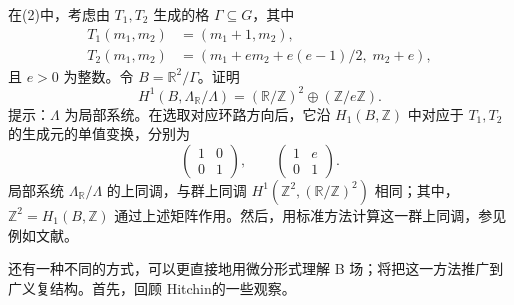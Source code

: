 \begin{exercise}\label{exer:6.23}
在(2)中，考虑由 $T_1,T_2$ 生成的格 $\Gamma\subseteq G$，其中
\[
\begin{aligned}
T_1(m_1,m_2)&=(m_1+1,m_2),\\
T_2(m_1,m_2)&=(m_1+em_2+e(e-1)/2,\;m_2+e),
\end{aligned}
\]
且 $e>0$ 为整数。令 $B=\mathbb R^2/\Gamma$。证明
\[
H^1(B,\Lambda_{\mathbb R}/\Lambda)
=(\mathbb R/\mathbb Z)^2\oplus(\mathbb Z/e\mathbb Z).
\]
提示：$\Lambda$ 为局部系统。在选取对应环路方向后，它沿 $H_1(B,\mathbb Z)$ 中对应于 $T_1,T_2$ 的生成元的单值变换，分别为
\[
\begin{pmatrix}1&0\\0&1\end{pmatrix},
\qquad
\begin{pmatrix}1&e\\0&1\end{pmatrix}.
\]
局部系统 $\Lambda_{\mathbb R}/\Lambda$ 的上同调，与群上同调 $H^1(\mathbb Z^2,(\mathbb R/\mathbb Z)^2)$ 相同；其中，$\mathbb Z^2=H_1(B,\mathbb Z)$ 通过上述矩阵作用。然后，用标准方法计算这一群上同调，参见例如文献。
\end{exercise}

还有一种不同的方式，可以更直接地用微分形式理解 B 场；将把这一方法推广到广义复结构。首先，回顾 Hitchin的一些观察。


